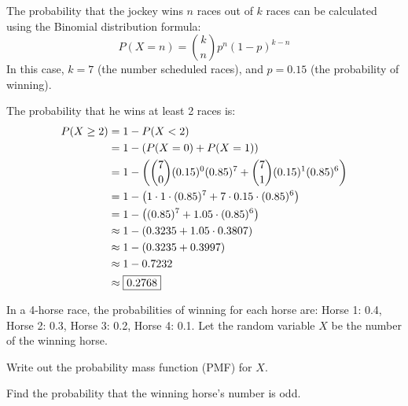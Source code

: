 \documentclass[a4paper, 10pt]{article}
\begin{document}
\begin{solution}
The probability that the jockey wins \( n \) races out of \( k \) races
can be calculated using the Binomial distribution formula:
\[
    P(X = n) = \binom{k}{n} p^n (1-p)^{k-n}
\]
In this case, \( k = 7 \) (the number scheduled races), and \( p = 0.15 \) (the probability of winning).

\par\noindent The probability that he wins at least 2 races is:
\begin{align*}
    P(X \geq 2) &= 1 - P(X < 2) \\
    &= 1 - (P(X = 0) + P(X = 1)) \\
    &= 1 - \left( \binom{7}{0} (0.15)^0 (0.85)^7 + \binom{7}{1} (0.15)^1 (0.85)^6 \right) \\
    &= 1 - \left( 1 \cdot 1 \cdot (0.85)^7 + 7 \cdot 0.15 \cdot (0.85)^6 \right) \\
    &= 1 - \left( (0.85)^7 + 1.05 \cdot (0.85)^6 \right) \\
    &\approx 1 - \left( 0.3235 + 1.05 \cdot 0.3807 \right) \\
    &\approx 1 - (0.3235 + 0.3997) \\
    &\approx 1 - 0.7232 \\
    &\approx \boxed{0.2768}
\end{align*}
\end{solution}


\begin{problem}
In a 4-horse race, the probabilities of winning for each horse are:
Horse 1: 0.4, Horse 2: 0.3, Horse 3: 0.2, Horse 4: 0.1.
Let the random variable \( X \) be the number of the winning horse.
\begin{subproblems}
    \item Write out the probability mass function (PMF) for \( X \).
    \item Find the probability that the winning horse's number is odd.
\end{subproblems}
\end{problem}
\end{document}
